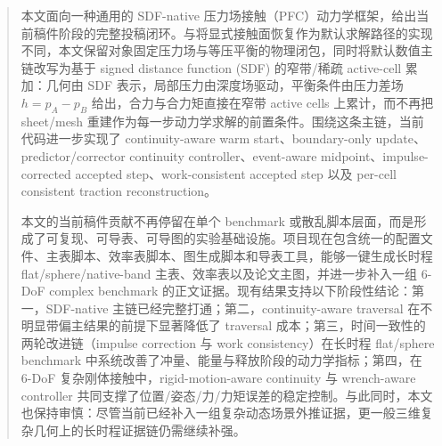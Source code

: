 \begin{abstract}
本文面向一种通用的 SDF-native 压力场接触（PFC）动力学框架，给出当前稿件阶段的完整投稿闭环。与将显式接触面恢复作为默认求解路径的实现不同，本文保留对象固定压力场与等压平衡的物理闭包，同时将默认数值主链改写为基于 signed distance function (SDF) 的窄带/稀疏 active-cell 累加：几何由 SDF 表示，局部压力由深度场驱动，平衡条件由压力差场 $h=p_A-p_B$ 给出，合力与合力矩直接在窄带 active cells 上累计，而不再把 sheet/mesh 重建作为每一步动力学求解的前置条件。围绕这条主链，当前代码进一步实现了 continuity-aware warm start、boundary-only update、predictor/corrector continuity controller、event-aware midpoint、impulse-corrected accepted step、work-consistent accepted step 以及 per-cell consistent traction reconstruction。

本文的当前稿件贡献不再停留在单个 benchmark 或散乱脚本层面，而是形成了可复现、可导表、可导图的实验基础设施。项目现在包含统一的配置文件、主表脚本、效率表脚本、图生成脚本和导表工具，能够一键生成长时程 flat/sphere/native-band 主表、效率表以及论文主图，并进一步补入一组 6-DoF complex benchmark 的正文证据。现有结果支持以下阶段性结论：第一，SDF-native 主链已经完整打通；第二，continuity-aware traversal 在不明显带偏主结果的前提下显著降低了 traversal 成本；第三，时间一致性的两轮改进链（impulse correction 与 work consistency）在长时程 flat/sphere benchmark 中系统改善了冲量、能量与释放阶段的动力学指标；第四，在 6-DoF 复杂刚体接触中，rigid-motion-aware continuity 与 wrench-aware controller 共同支撑了位置/姿态/力/力矩误差的稳定控制。与此同时，本文也保持审慎：尽管当前已经补入一组复杂动态场景外推证据，更一般三维复杂几何上的长时程证据链仍需继续补强。
\end{abstract}
